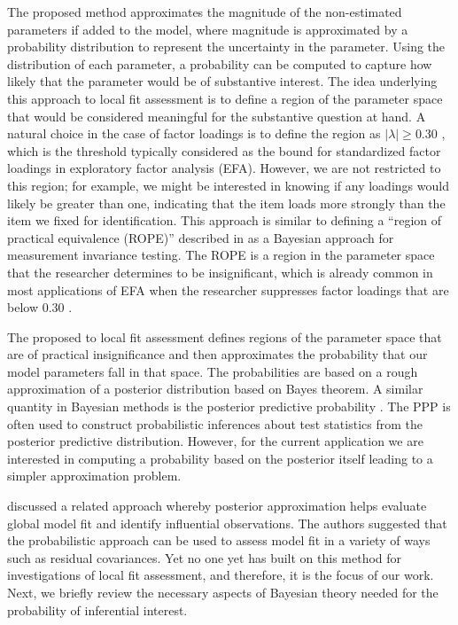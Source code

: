 \documentclass[man, noextraspace, floatsintext, 12pt]{apa7}
\begin{document}
The proposed method approximates the magnitude of the non-estimated parameters if added to the model, where magnitude is approximated by a probability distribution to represent the uncertainty in the parameter. 
Using the distribution of each parameter, a probability can be computed to capture how likely that the parameter would be of substantive interest.
The idea underlying this approach to local fit assessment is to define a region of the parameter space that would be considered meaningful for the substantive question at hand. 
A natural choice in the case of factor loadings is to define the region as $\vert \lambda \vert \geq 0.30$ \citep{Benson1998}, which is the threshold typically considered as the bound for standardized factor loadings in exploratory factor analysis (EFA).
However, we are not restricted to this region; for example, we might be interested in knowing if any loadings would likely be greater than one, indicating that the item loads more strongly than the item we fixed for identification.
This approach is similar to defining a ``region of practical equivalence (ROPE)'' described in \textcite{Shi2019} as a Bayesian approach for measurement invariance testing.
The ROPE is a region in the parameter space that the researcher determines to be insignificant, which is already common in most applications of EFA when the researcher suppresses factor loadings that are below 0.30 \citep{Benson1998}.

The proposed to local fit assessment defines regions of the parameter space that are of practical insignificance and then approximates the probability that our model parameters fall in that space.
The probabilities are based on a rough approximation of a posterior distribution based on Bayes theorem.
A similar quantity in Bayesian methods is the posterior predictive probability \citep[PPP or $p$-value, ][]{Gelman1996, Rubin1996}.
The PPP is often used to construct probabilistic inferences about test statistics from the posterior predictive distribution.
However, for the current application we are interested in computing a probability based on the posterior itself leading to a simpler approximation problem.
 
\textcite{Lee2016} discussed a related approach whereby posterior approximation helps evaluate global model fit and identify influential observations.
The authors suggested that the probabilistic approach can be used to assess model fit in a variety of ways such as residual covariances.
Yet no one yet has built on this method for investigations of local fit assessment, and therefore, it is the focus of our work.
Next, we briefly review the necessary aspects of Bayesian theory needed for the probability of inferential interest.
\end{document}
